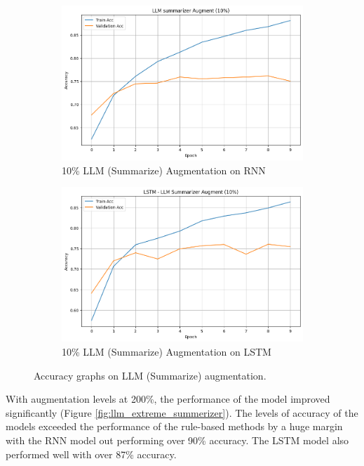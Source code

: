 \documentclass[10pt]{extarticle}
\begin{document}
\begin{figure}[ht]
  \centering
  \begin{subfigure}[b]{0.45\textwidth}
    \includegraphics[width=\textwidth]{img/llm_summarise_10_rnn.png}
    \caption{10\% LLM (Summarize) Augmentation on RNN}
    \label{fig:llm_summarise_10_rnn}
  \end{subfigure}
  \hfill
  \begin{subfigure}[b]{0.45\textwidth}
    \includegraphics[width=\textwidth]{img/llm_summarise_10_lstm.png}
    \caption{10\% LLM (Summarize) Augmentation on LSTM}
    \label{fig:llm_summarise_10_lstm}
  \end{subfigure}
  \caption{Accuracy graphs on LLM (Summarize) augmentation.}
  \label{fig:llm_summerizer}
\end{figure}

With augmentation levels at 200\%, the performance of the model improved
significantly (Figure \ref{fig:llm_extreme_summerizer}). The levels of accuracy
of the models exceeded the performance of the rule-based methods by a huge
margin with the RNN model out performing over 90\% accuracy. The LSTM model
also performed well with over 87\% accuracy.
\end{document}
